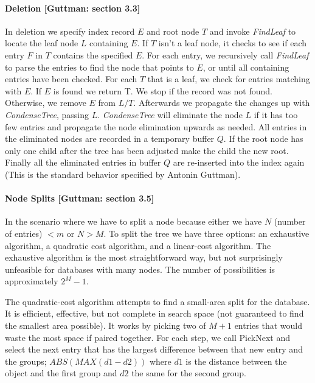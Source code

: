 \documentclass[12pt]{article}
\begin{document}
\paragraph{Deletion [Guttman: section 3.3]}
In deletion we specify index record $E$ and root node $T$ and
invoke {\em FindLeaf} to locate the leaf node $L$ containing
$E$. If $T$ isn't a leaf node, it checks to see if each entry $F$
in $T$ contains the specified $E$. For each entry, we recursively
call {\em FindLeaf} to parse the entries to find the node that
points to $E$, or until all containing entries have been
checked. For each $T$ that is a leaf, we check for entries
matching with $E$. If $E$ is found we return T. We stop if the
record was not found.  Otherwise, we remove $E$ from $L/T$.
Afterwards we propagate the changes up with {\em CondenseTree},
passing $L$.  {\em CondenseTree} will eliminate the node $L$ if it
has too few entries and propagate the node elimination upwards as
needed.  All entries in the eliminated nodes are recorded in a
temporary buffer $Q$. If the root node has only one child after
the tree has been adjusted make the child the new root.  Finally
all the eliminated entries in buffer $Q$ are re-inserted into the
index again (This is the standard behavior specified by Antonin
Guttman).



\paragraph{Node Splits [Guttman: section 3.5]}
In the scenario where we have to split a node because either we
have $N$ (number of entries) $< m$ or $N > M$. To split the tree
we have three options: an exhaustive algorithm, a quadratic cost
algorithm, and a linear-cost algorithm. The exhaustive algorithm
is the most straightforward way, but not surprisingly unfeasible
for databases with many nodes. The number of possibilities is
approximately $2^M-1$.

The quadratic-cost algorithm attempts to find a small-area split
for the database. It is efficient, effective, but not complete in
search space (not guaranteed to find the smallest area
possible). It works by picking two of $M+1$ entries that would
waste the most space if paired together. For each step, we call
PickNext and select the next entry that has the largest difference
between that new entry and the groups; $ABS(MAX(d1-d2))$ where
$d1$ is the distance between the object and the first group and
$d2$ the same for the second group.
\end{document}
